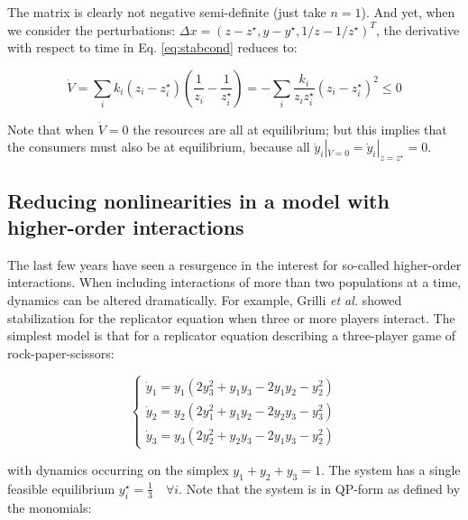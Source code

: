 \documentclass{article}
\begin{document}
The matrix is clearly not negative semi-definite (just take \(n = 1\)).
And yet, when we consider the perturbations:
\(\Delta x = (z - z^\star, y - y^\star, 1 / z - 1 / z^\star)^T\), the
derivative with respect to time in Eq. \ref{eq:stabcond} reduces to:

\begin{equation}
\dot{V} = \sum_i k_i (z_i - z_i^\star) \left( \frac{1}{z_i} - \frac{1}{z_i^\star} \right) = - \sum_i \frac{k_i}{z_i z_i^\star} (z_i - z_i^\star)^2 \leq 0
\end{equation}

Note that when \(\dot{V} = 0\) the resources are all at equilibrium; but
this implies that the consumers must also be at equilibrium, because all
\(\dot{y}_i|_{\dot{V} = 0} = \dot{y}_i|_{z = z^\star} = 0\).

\hypertarget{reducing-nonlinearities-in-a-model-with-higher-order-interactions}{%
\subsection{Reducing nonlinearities in a model with higher-order
interactions}\label{reducing-nonlinearities-in-a-model-with-higher-order-interactions}}

\label{sec:hoi}

The last few years have seen a resurgence in the interest for so-called
higher-order interactions. When including interactions of more than two
populations at a time, dynamics can be altered dramatically. For
example, Grilli \textit{et al.} showed stabilization for the replicator
equation when three or more players interact. The simplest model is that
for a replicator equation describing a three-player game of
rock-paper-scissors:

\begin{equation}
\label{eq:rpshoi}
\begin{cases}
\dot{y}_1 = y_1 (2 y_3^2 + y_1 y_3 - 2 y_1 y_2 - y_2^2)\\
\dot{y}_2 = y_2 (2 y_1^2 + y_1 y_2 - 2 y_2 y_3 - y_3^2)\\
\dot{y}_3 = y_3 (2 y_2^2 + y_2 y_3 - 2 y_1 y_3 - y_2^2)
\end{cases}
\end{equation}

with dynamics occurring on the simplex \(y_1 + y_2 + y_3 = 1\). The
system has a single feasible equilibrium
\(y_i^\star = \frac{1}{3} \quad \forall i\). Note that the system is in
QP-form as defined by the monomials:
\end{document}

